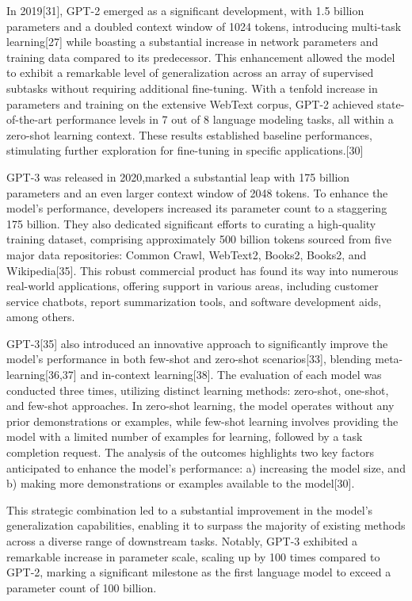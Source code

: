 \documentclass[conference]{IEEEtran}
\begin{document}
In 2019[31], GPT-2 emerged as a significant development, with 1.5 billion parameters and a doubled context window of 1024 tokens, introducing multi-task learning[27] while boasting a substantial increase in network parameters and training data compared to its predecessor. This enhancement allowed the model to exhibit a remarkable level of generalization across an array of supervised subtasks without requiring additional fine-tuning. With a tenfold increase in parameters and training on the extensive WebText corpus, GPT-2 achieved state-of-the-art performance levels in 7 out of 8 language modeling tasks, all within a zero-shot learning context. These results established baseline performances, stimulating further exploration for fine-tuning in specific applications.[30]

GPT-3 was released in 2020,marked a substantial leap with 175 billion parameters and an even larger context window of 2048 tokens. To enhance the model's performance, developers increased its parameter count to a staggering 175 billion. They also dedicated significant efforts to curating a high-quality training dataset, comprising approximately 500 billion tokens sourced from five major data repositories: Common Crawl, WebText2, Books2, Books2, and Wikipedia[35]. This robust commercial product has found its way into numerous real-world applications, offering support in various areas, including customer service chatbots, report summarization tools, and software development aids, among others.

GPT-3[35] also introduced an innovative approach to significantly improve the model's performance in both few-shot and zero-shot scenarios[33], blending meta-learning[36,37] and in-context learning[38]. The evaluation of each model was conducted three times, utilizing distinct learning methods: zero-shot, one-shot, and few-shot approaches. In zero-shot learning, the model operates without any prior demonstrations or examples, while few-shot learning involves providing the model with a limited number of examples for learning, followed by a task completion request. The analysis of the outcomes highlights two key factors anticipated to enhance the model's performance: a) increasing the model size, and b) making more demonstrations or examples available to the model[30].

This strategic combination led to a substantial improvement in the model's generalization capabilities, enabling it to surpass the majority of existing methods across a diverse range of downstream tasks. Notably, GPT-3 exhibited a remarkable increase in parameter scale, scaling up by 100 times compared to GPT-2, marking a significant milestone as the first language model to exceed a parameter count of 100 billion.
\end{document}
